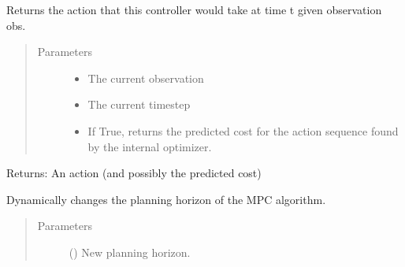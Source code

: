 \documentclass[letterpaper,10pt,english,openany,oneside]{sphinxmanual}
\begin{document}
\begin{fulllineitems}
\begin{quote}
\begin{description}
\begin{description}
\begin{description}
\end{description}

\end{description}


\end{description}\end{quote}

\begin{fulllineitems}
\label{\detokenize{_modules/controllers:controllers.MPC.MPC.act}}
Returns the action that this controller would take at time t given observation obs.
\begin{quote}\begin{description}
\item[{Parameters}] \leavevmode\begin{itemize}
\item {} 
 \textendash{} The current observation

\item {} 
 \textendash{} The current timestep

\item {} 
 \textendash{} If True, returns the predicted cost for the action sequence found by
the internal optimizer.

\end{itemize}

\end{description}\end{quote}

Returns: An action (and possibly the predicted cost)

\end{fulllineitems}


\begin{fulllineitems}
\label{\detokenize{_modules/controllers:controllers.MPC.MPC.changePlanHor}}
Dynamically changes the planning horizon of the MPC algorithm.
\begin{quote}\begin{description}
\item[{Parameters}] \leavevmode
{} () \textendash{} New planning horizon.


\end{description}
\end{quote}
\end{fulllineitems}
\end{fulllineitems}
\end{document}

